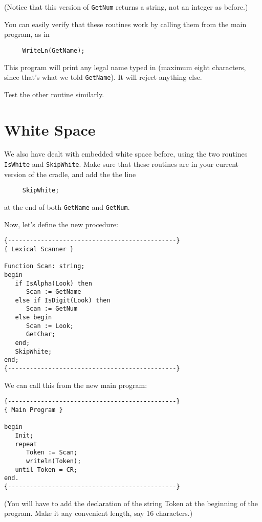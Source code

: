(Notice  that this version of {\tt GetNum} returns  a  string, not  an integer as before.)

You  can  easily  verify that these routines work by calling them from the main program, as in

\begin{verbatim}
     WriteLn(GetName);
\end{verbatim}

This  program  will  print any legal name typed in (maximum eight characters, since that's what we told {\tt GetName}). It  will reject anything else.

Test the other routine similarly.


\section{White Space}

We  also  have  dealt with embedded white space before, using the two  routines  {\tt IsWhite} and  {\tt SkipWhite}. Make  sure that  these routines are in your  current  version of the cradle, and add the the line

\begin{verbatim}
     SkipWhite;
\end{verbatim}

at the end of both {\tt GetName} and {\tt GetNum}.

Now, let's define the new procedure:

\begin{verbatim}
{----------------------------------------------}
{ Lexical Scanner }

Function Scan: string;
begin
   if IsAlpha(Look) then
      Scan := GetName
   else if IsDigit(Look) then
      Scan := GetNum
   else begin
      Scan := Look;
      GetChar;
   end;
   SkipWhite;
end;
{----------------------------------------------}
\end{verbatim}

We can call this from the new main program:

\begin{verbatim}
{----------------------------------------------}
{ Main Program }

begin
   Init;
   repeat
      Token := Scan;
      writeln(Token);
   until Token = CR;
end.
{----------------------------------------------}
\end{verbatim}

(You will have to add the declaration of the string Token  at the beginning of the program. Make it any convenient length, say 16 characters.)

